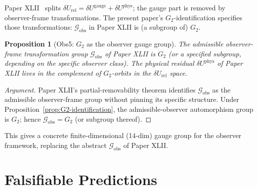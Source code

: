 \documentclass[12pt]{article}
\newtheorem{proposition}[theorem]{Proposition}
\theoremstyle{definition}
\theoremstyle{remark}
\newcommand{\Gtwo}{G_2}
\begin{document}
Paper XLII~\citep{SmartXLII} splits $\delta U_{\mathrm{rel}} = \delta U^{\mathrm{gauge}} + \delta U^{\mathrm{phys}}$; the gauge part is removed by observer-frame transformations. The present paper's $\Gtwo$-identification specifies those transformations: $\mathcal{G}_{\mathrm{obs}}$ in Paper XLII is (a subgroup of) $\Gtwo$.

\begin{proposition}[Obs5: $\Gtwo$ as the observer gauge group]\label{prop:G2-as-gauge}
The admissible observer-frame transformation group $\mathcal{G}_{\mathrm{obs}}$ of Paper XLII is $\Gtwo$ (or a specified subgroup, depending on the specific observer class). The physical residual $\delta U^{\mathrm{phys}}$ of Paper XLII lives in the complement of $\Gtwo$-orbits in the $\delta U_{\mathrm{rel}}$ space.
\end{proposition}

\begin{proof}[Argument]
Paper XLII's partial-removability theorem identifies $\mathcal{G}_{\mathrm{obs}}$ as the admissible observer-frame group without pinning its specific structure. Under Proposition~\ref{prop:G2-identification}, the admissible-observer automorphism group is $\Gtwo$; hence $\mathcal{G}_{\mathrm{obs}} = \Gtwo$ (or subgroup thereof).
\end{proof}

This gives a concrete finite-dimensional (14-dim) gauge group for the observer framework, replacing the abstract $\mathcal{G}_{\mathrm{obs}}$ of Paper XLII.

\section{Falsifiable Predictions}\label{sec:predictions}
\end{document}
